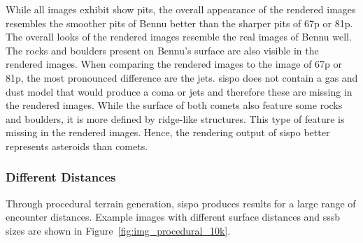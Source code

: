 While all images exhibit show pits, the overall appearance of the rendered images resembles the smoother pits of Bennu better than the sharper pits of \gls{67p} or \gls{81p}. The overall looks of the rendered images resemble the real images of Bennu well. The rocks and boulders present on Bennu's surface are also visible in the rendered images. When comparing the rendered images to the image of \gls{67p} or \gls{81p}, the most pronounced difference are the jets. \Gls{sispo} does not contain a gas and dust model that would produce a coma or jets and therefore these are missing in the rendered images. While the surface of both comets also feature some rocks and boulders, it is more defined by ridge-like structures. This type of feature is missing in the rendered images. Hence, the rendering output of \gls{sispo} better represents asteroids than comets.

\subsubsection{Different Distances}
Through procedural terrain generation, \gls{sispo} produces results for a large range of encounter distances. Example images with different surface distances and \gls{sssb} sizes are shown in Figure~\ref{fig:img_procedural_10k}.

